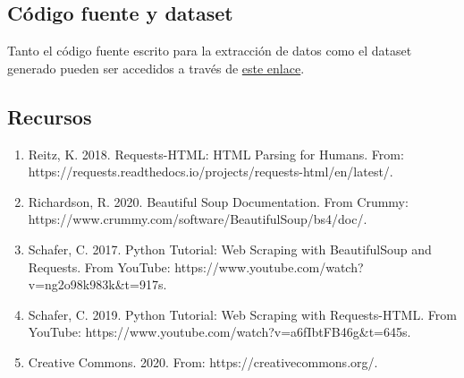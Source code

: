 \documentclass[]{article}
\providecommand{\tightlist}{%
  \setlength{\itemsep}{0pt}\setlength{\parskip}{0pt}}
\begin{document}
\hypertarget{cadigo-fuente-y-dataset}{%
\subsection{Código fuente y dataset}\label{cadigo-fuente-y-dataset}}

Tanto el código fuente escrito para la extracción de datos como el
dataset generado pueden ser accedidos a través de
\href{https://github.com/raquel8893/Tipologia-PRA1}{este enlace}.

\hypertarget{recursos}{%
\subsection{Recursos}\label{recursos}}

\begin{enumerate}
\def\labelenumi{\arabic{enumi}.}
\tightlist
\item
Reitz, K. 2018. Requests-HTML: HTML Parsing for Humans. From: https://requests.readthedocs.io/projects/requests-html/en/latest/.\\
\item
Richardson, R. 2020. Beautiful Soup Documentation. From Crummy: https://www.crummy.com/software/BeautifulSoup/bs4/doc/.\\
\item
Schafer, C. 2017. Python Tutorial: Web Scraping with BeautifulSoup and Requests. From YouTube: https://www.youtube.com/watch?v=ng2o98k983k\&t=917s.\\
\item
Schafer, C. 2019. Python Tutorial: Web Scraping with Requests-HTML. From YouTube: https://www.youtube.com/watch?v=a6fIbtFB46g\&t=645s.\\
\item
Creative Commons. 2020. From: https://creativecommons.org/.\\

\end{enumerate}
\end{document}
